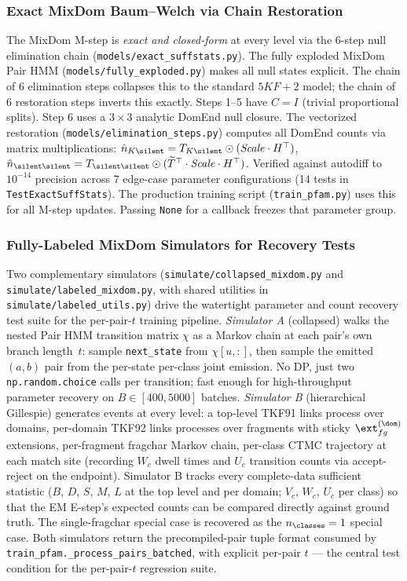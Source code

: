\subsubsection{Exact MixDom Baum--Welch via Chain Restoration}
The MixDom M-step is \emph{exact and closed-form} at every level via
the 6-step null elimination chain (\texttt{models/exact\_suffstats.py}).
The fully exploded MixDom Pair HMM (\texttt{models/fully\_exploded.py})
makes all null states explicit. The chain of 6 elimination steps
collapses this to the standard $5KF{+}2$ model; the chain of 6
restoration steps inverts this exactly.
Steps 1--5 have $C = I$ (trivial proportional splits).
Step 6 uses a $3 \times 3$ analytic DomEnd null closure.
The vectorized restoration (\texttt{models/elimination\_steps.py})
computes all DomEnd counts via matrix multiplications:
$\hat{n}_{K\silent} = T_{K\silent} \odot (\mathit{Scale} \cdot H^\top)$,
$\hat{n}_{\silent\silent} = T_{\silent\silent} \odot
(\widetilde{T}^\top \cdot \mathit{Scale} \cdot H^\top)$.
Verified against autodiff to $10^{-14}$ precision across
7 edge-case parameter configurations (14 tests in
\texttt{TestExactSuffStats}).
The production training script (\texttt{train\_pfam.py}) uses this
for all M-step updates.
Passing \texttt{None} for a callback freezes that parameter group.

\subsubsection{Fully-Labeled MixDom Simulators for Recovery Tests}
Two complementary simulators (\texttt{simulate/collapsed\_mixdom.py} and
\texttt{simulate/labeled\_mixdom.py}, with shared utilities in
\texttt{simulate/labeled\_utils.py}) drive the watertight parameter and
count recovery test suite for the per-pair-$t$ training pipeline.
\emph{Simulator A} (collapsed) walks the nested Pair HMM transition
matrix $\chi$ as a Markov chain at each pair's own branch length~$t$:
sample \texttt{next\_state} from $\chi[u, :]$, then sample the emitted
$(a, b)$ pair from the per-state per-class joint emission. No DP, just
two \texttt{np.random.choice} calls per transition; fast enough for
high-throughput parameter recovery on $B \in [400, 5000]$ batches.
\emph{Simulator B} (hierarchical Gillespie) generates events at every
level: a top-level TKF91 links process over domains, per-domain TKF92
links processes over fragments with sticky $\ext^{(\dom)}_{fg}$
extensions, per-fragment fragchar Markov chain, per-class CTMC
trajectory at each match site (recording $W_c$ dwell times and $U_c$
transition counts via accept-reject on the endpoint). Simulator B
tracks every complete-data sufficient statistic
($B$, $D$, $S$, $M$, $L$ at the top level and per domain;
$V_c$, $W_c$, $U_c$ per class) so that the EM E-step's expected
counts can be compared directly against ground truth. The single-fragchar special case is
recovered as the $n_\classes = 1$ special case. Both simulators
return the precompiled-pair tuple format consumed by
\texttt{train\_pfam.\_process\_pairs\_batched}, with explicit per-pair
$t$ — the central test condition for the per-pair-$t$ regression suite.

